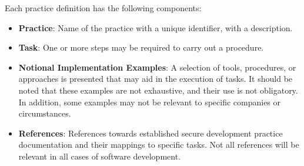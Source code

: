 Each practice definition has the following components:
\begin{itemize}
  \item \textbf{Practice}: Name of the practice with a unique identifier, with a description. 
  \item \textbf{Task}: One or more steps may be required to carry out a procedure.
  \item \textbf{Notional Implementation Examples}: A selection of tools, procedures, or approaches is presented that may aid in the execution of tasks. It should be noted that these examples are not exhaustive, and their use is not obligatory. In addition, some examples may not be relevant to specific companies or circumstances.
  \item \textbf{References}: References towards established secure development practice documentation and their mappings to specific tasks. Not all references will be relevant in all cases of software development. 
\end{itemize}
